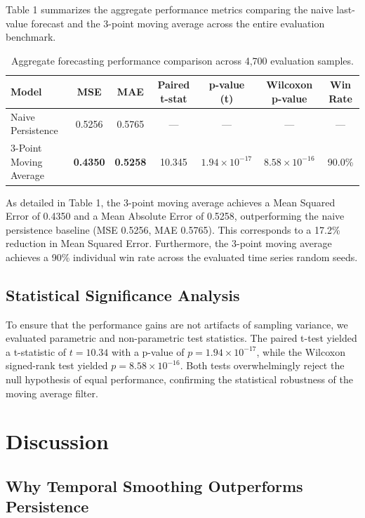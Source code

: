 \documentclass[10pt,letterpaper]{article}
\begin{document}
Table 1 summarizes the aggregate performance metrics comparing the naive last-value forecast and the 3-point moving average across the entire evaluation benchmark.

\begin{table}[htbp]
\centering
\caption{Aggregate forecasting performance comparison across 4,700 evaluation samples.}
\begin{tabular}{lcccccc}
\hline
Model & MSE & MAE & Paired t-stat & p-value (t) & Wilcoxon p-value & Win Rate \\
\hline
Naive Persistence & 0.5256 & 0.5765 & — & — & — & — \\
3-Point Moving Average & \textbf{0.4350} & \textbf{0.5258} & 10.345 & $1.94 \times 10^{-17}$ & $8.58 \times 10^{-16}$ & 90.0\% \\
\hline
\end{tabular}
\label{tab:results}
\end{table}

As detailed in Table 1, the 3-point moving average achieves a Mean Squared Error of 0.4350 and a Mean Absolute Error of 0.5258, outperforming the naive persistence baseline (MSE 0.5256, MAE 0.5765). This corresponds to a 17.2\% reduction in Mean Squared Error. Furthermore, the 3-point moving average achieves a 90\% individual win rate across the evaluated time series random seeds.

\subsection{Statistical Significance Analysis}

To ensure that the performance gains are not artifacts of sampling variance, we evaluated parametric and non-parametric test statistics. The paired t-test yielded a t-statistic of $t = 10.34$ with a p-value of $p = 1.94 \times 10^{-17}$, while the Wilcoxon signed-rank test yielded $p = 8.58 \times 10^{-16}$. Both tests overwhelmingly reject the null hypothesis of equal performance, confirming the statistical robustness of the moving average filter.

\section{Discussion}

\subsection{Why Temporal Smoothing Outperforms Persistence}
\end{document}
